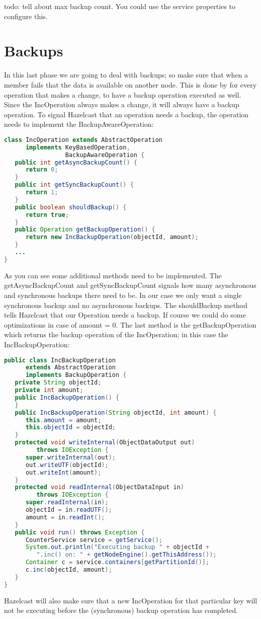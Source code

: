 todo: tell about max backup count. You could use the service properties to configure this.

\section{Backups}
In this last phase we are going to deal with backups; so make sure that when a member fails that the data is available on another node. This is done by for every operation that makes a change, to have a backup operation executed as well. Since the IncOperation always makes a change, it will always have a backup operation. To signal Hazelcast that an operation needs a backup, the operation needs to implement the BackupAwareOperation:
\begin{lstlisting}[language=java]
class IncOperation extends AbstractOperation 
      implements KeyBasedOperation, 
                 BackupAwareOperation {
   public int getAsyncBackupCount() {
      return 0;
   }
   public int getSyncBackupCount() {
      return 1;
   }
   public boolean shouldBackup() {
      return true;
   }
   public Operation getBackupOperation() {
      return new IncBackupOperation(objectId, amount);
   }
   ...
}
\end{lstlisting}
As you can see some additional methods need to be implemented. The getAsyncBackupCount and getSyncBackupCount signals how many asynchronous and synchronous backups there need to be. In our case we only want a single synchronous backup and no asynchronous backups. The shouldBackup method tells Hazelcast that our Operation needs a backup. If course we could do some optimizations in case of amount = 0. The last method is the getBackupOperation which returns the backup operation of the IncOperation; in this case the IncBackupOperation:

\begin{lstlisting}[language=java]
public class IncBackupOperation 
      extends AbstractOperation 
      implements BackupOperation {
   private String objectId;
   private int amount;
   public IncBackupOperation() {
   }
   public IncBackupOperation(String objectId, int amount) {
      this.amount = amount;
      this.objectId = objectId;
   }
   protected void writeInternal(ObjectDataOutput out) 
         throws IOException {
      super.writeInternal(out);
      out.writeUTF(objectId);
      out.writeInt(amount);
   }
   protected void readInternal(ObjectDataInput in) 
         throws IOException {
      super.readInternal(in);
      objectId = in.readUTF();
      amount = in.readInt();
   }
   public void run() throws Exception {
      CounterService service = getService();
      System.out.println("Executing backup " + objectId + 
         ".inc() on: " + getNodeEngine().getThisAddress());
      Container c = service.containers[getPartitionId()];
      c.inc(objectId, amount);
   }
}
\end{lstlisting}
Hazelcast will also make sure that a new IncOperation for that particular key will not be executing before the (synchronous) backup operation has completed.

